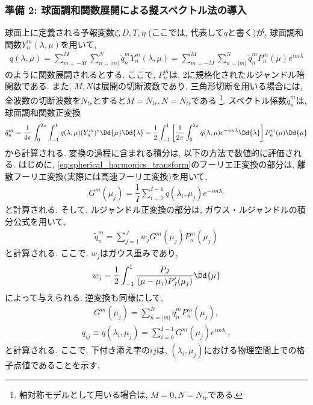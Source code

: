 \subsubsection*{準備 2: 球面調和関数展開による擬スペクトル法の導入}
球面上に定義される予報変数$\zeta,D,T,\eta$ (ここでは, 代表して$q$と書く)が, 球面調和関数$Y^m_n(\lambda,\mu)$を用いて, 
\begin{align}
 q(\lambda,\mu) = \sum_{m=-M}^{M} \sum_{n=|m|}^N \tilde{q}^m_n Y^m_n (\lambda,\mu)
   = \sum_{m=-M}^{M} \sum_{n=|m|}^N \tilde{q}^m_n  P^m_n (\mu) e^{im\lambda}
\end{align}
のように関数展開されるとする. 
ここで, $P^m_n$は, 2に規格化されたルジャンドル陪関数である. 
また, $M,N$は展開の切断波数であり, 三角形切断を用いる場合には, 全波数の切断波数を$N_{tr}$とすると$M=N_{tr},N=N_{tr}$である%
\footnote{
軸対称モデルとして用いる場合は, $M=0, N=N_{tr}$である. 
}. 
スペクトル係数$\tilde{q}^m_n$は, 球面調和関数正変換
\begin{align}
 \tilde{q}^m_n 
 = \dfrac{1}{4\pi}\int_0^{2\pi} \int_{-1}^1 q(\lambda,\mu) (Y^m_n )^* \Dd{\mu}\Dd{\lambda} 
 =   \dfrac{1}{2}\int_{-1}^1 \left[ 
       \dfrac{1}{2\pi} \int_0^{2\pi} q(\lambda,\mu) e^{-im\lambda}\Dd{\lambda} 
      \right]P^m_n (\mu) \Dd{\mu}  
\label{eq:spherical_harmonics_transform}
\end{align}
から計算される.  
変換の過程に含まれる積分は, 以下の方法で数値的に評価される. 
はじめに, \eqref{eq:spherical_harmonics_transform}のフーリエ正変換の部分は, 
離散フーリエ変換(実際には高速フーリエ変換)を用いて, 
\begin{align}
  G^m(\mu_j) = \dfrac{1}{I}\sum_{i=0}^{I-1} q(\lambda_i,\mu_j) e^{-im\lambda_i}
\label{eq:transform_fourier}
\end{align}
と計算される. 
そして, ルジャンドル正変換の部分は, ガウス・ルジャンドルの積分公式を用いて, 
\begin{align}
 \tilde{q}^m_n = \sum_{j=1}^J w_j G^m(\mu_j) P^m_n(\mu_j)
\label{eq:transform_legendre}
\end{align}
と計算される. 
ここで, $w_j$はガウス重みであり, 
\begin{align}
 w_j = \dfrac{1}{2}\int_{-1}^1 \dfrac{P_J}{(\mu-\mu_j)P'_J(\mu_j)} \Dd{\mu}
\end{align}
によって与えられる. 
逆変換も同様にして, 
\begin{align}
  G^m(\mu_j) = \sum_{n=|m|}^N \tilde{q}^m_n P^m_n(\mu_j), 
\end{align}
\begin{align}
  q_{ij} \equiv q(\lambda_i,\mu_j) = \sum_{i=0}^{I-1} G^m(\mu_j) e^{im\lambda_i}, 
\end{align}
と計算される. 
ここで, 下付き添え字の$ij$は, $(\lambda_i,\mu_j)$における物理空間上での格子点値であることを示す. 

